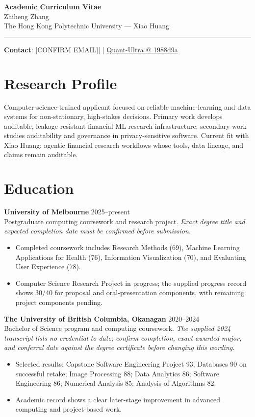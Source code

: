 \documentclass[11pt]{article}
\makeatletter
\newcommand{\ApplicantName}{Zhiheng Zhang}
\newcommand{\ApplicantEmail}{[CONFIRM EMAIL]}
\newcommand{\ApplicantPhone}{[CONFIRM PHONE]}
\newcommand{\ApplicantGitHub}{\href{https://github.com/zhiheng-zhang-Mera/Quant-Ultra/tree/1988d9a8530da91a8158de864d098ea869098923}{Quant-Ultra @ 1988d9a}}
\makeatother
\begin{document}
\begin{center}
{\LARGE\bfseries Academic Curriculum Vitae}\\[0.25em]
{\large \ApplicantName}\\
The Hong Kong Polytechnic University --- Xiao Huang
\end{center}
\vspace{0.35em}\hrule\vspace{0.65em}

\textbf{Contact}: \ApplicantEmail\quad | \quad \ApplicantPhone\quad | \quad \ApplicantGitHub

\section*{Research Profile}
Computer-science-trained applicant focused on reliable machine-learning and data systems for non-stationary, high-stakes decisions. Primary work develops auditable, leakage-resistant financial ML research infrastructure; secondary work studies auditability and governance in privacy-sensitive software. Current fit with Xiao Huang: agentic financial research workflows whose tools, data lineage, and claims remain auditable.

\section*{Education}
\textbf{University of Melbourne} \hfill 2025--present\\
Postgraduate computing coursework and research project. \textit{Exact degree title and expected completion date must be confirmed before submission.}
\begin{itemize}
\item Completed coursework includes Research Methods (69), Machine Learning Applications for Health (76), Information Visualization (70), and Evaluating User Experience (78).
\item Computer Science Research Project in progress; the supplied progress record shows 30/40 for proposal and oral-presentation components, with remaining project components pending.
\end{itemize}

\textbf{The University of British Columbia, Okanagan} \hfill 2020--2024\\
Bachelor of Science program and computing coursework. \textit{The supplied 2024 transcript lists no credential to date; confirm completion, exact awarded major, and conferral date against the degree certificate before changing this wording.}
\begin{itemize}
\item Selected results: Capstone Software Engineering Project 93; Databases 90 on successful retake; Image Processing 88; Data Analytics 86; Software Engineering 86; Numerical Analysis 85; Analysis of Algorithms 82.
\item Academic record shows a clear later-stage improvement in advanced computing and project-based work.
\end{itemize}
\end{document}
